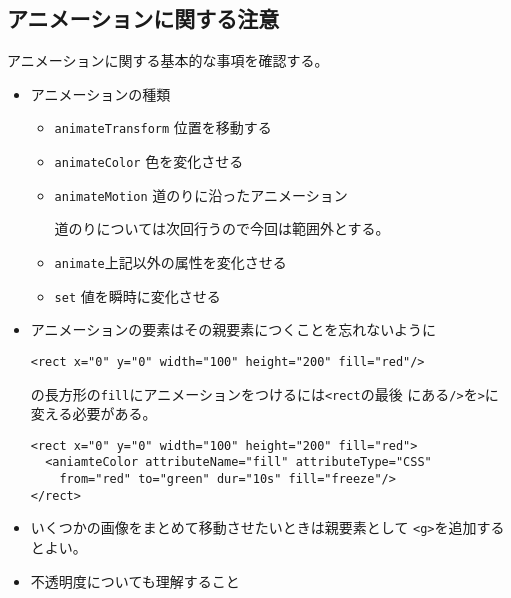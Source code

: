 \documentclass[a4j]{jarticle}
\begin{document}
\subsection{アニメーションに関する注意}
アニメーションに関する基本的な事項を確認する。
\begin{itemize}
 \item アニメーションの種類
\begin{itemize}
 \item \texttt{animateTransform} 位置を移動する
 \item \texttt{animateColor} 色を変化させる
 \item \texttt{animateMotion} 道のりに沿ったアニメーション
 
道のりについては次回行うので今回は範囲外とする。
 \item \texttt{animate}上記以外の属性を変化させる
 \item \texttt{set} 値を瞬時に変化させる
\end{itemize}
 \item アニメーションの要素はその親要素につくことを忘れないように
\begin{verbatim}
<rect x="0" y="0" width="100" height="200" fill="red"/>
\end{verbatim}
の長方形の\texttt{fill}にアニメーションをつけるには\texttt{<rect}の最後
       にある\texttt{/>}を\texttt{>}に変える必要がある。
\begin{Verbatim}
<rect x="0" y="0" width="100" height="200" fill="red">
  <aniamteColor attributeName="fill" attributeType="CSS" 
    from="red" to="green" dur="10s" fill="freeze"/>
</rect>
\end{Verbatim}
 \item いくつかの画像をまとめて移動させたいときは親要素として
       \texttt{<g>}を追加するとよい。
 \item 不透明度についても理解すること
\end{itemize}
\end{document}
